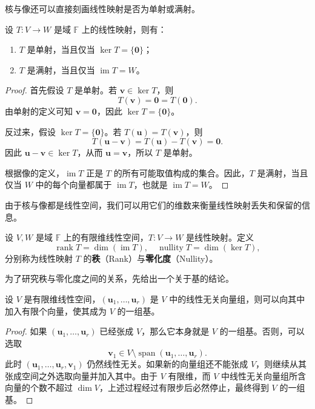 核与像还可以直接刻画线性映射是否为单射或满射。
\begin{theorem}[单射与满射的判定]
    \label{thm_injective_surjective_kernel_image}
    设 \(T:V\to W\) 是域 \(\mathbb F\) 上的线性映射，则有：
    \begin{enumerate}
        \item \(T\) 是单射，当且仅当 \(\ker T=\{\bm 0\}\)；
        \item \(T\) 是满射，当且仅当 \(\operatorname{im}T=W\)。
    \end{enumerate}
\end{theorem}
\begin{proof}
    首先假设 \(T\) 是单射。若 \(\bm v\in\ker T\)，则
    \[
        T(\bm v)=\bm 0=T(\bm 0).
    \]
    由单射的定义可知 \(\bm v=\bm 0\)，因此 \(\ker T=\{\bm 0\}\)。

    反过来，假设 \(\ker T=\{\bm 0\}\)。若 \(T(\bm u)=T(\bm v)\)，则
    \[
        T(\bm u-\bm v)=T(\bm u)-T(\bm v)=\bm 0.
    \]
    因此 \(\bm u-\bm v\in\ker T\)，从而 \(\bm u=\bm v\)，所以 \(T\) 是单射。

    根据像的定义，\(\operatorname{im}T\) 正是 \(T\) 的所有可能取值构成的集合。因此，\(T\) 是满射，当且仅当 \(W\) 中的每个向量都属于 \(\operatorname{im}T\)，也就是 \(\operatorname{im}T=W\)。
\end{proof}

由于核与像都是线性空间，我们可以用它们的维数来衡量线性映射丢失和保留的信息。
\begin{definition}[线性映射的秩与零化度]
    \label{def_linear_map_rank_nullity}
    设 \(V,W\) 是域 \(\mathbb F\) 上的有限维线性空间，\(T:V\to W\) 是线性映射。定义
    \[
        \operatorname{rank}T=\dim(\operatorname{im}T),
        \quad
        \operatorname{nullity}T=\dim(\ker T),
    \]
    分别称为线性映射 \(T\) 的\textbf{秩}（Rank）与\textbf{零化度}（Nullity）。
\end{definition}

为了研究秩与零化度之间的关系，先给出一个关于基的结论。
\begin{lemma}[基扩充]
    \label{lem_basis_extension}
    设 \(V\) 是有限维线性空间，\((\bm u_1,\ldots,\bm u_r)\) 是 \(V\) 中的线性无关向量组，则可以向其中加入有限个向量，使其成为 \(V\) 的一组基。
\end{lemma}
\begin{proof}
    如果 \((\bm u_1,\ldots,\bm u_r)\) 已经张成 \(V\)，那么它本身就是 \(V\) 的一组基。否则，可以选取
    \[
        \bm v_1\in V\setminus\operatorname{span}(\bm u_1,\ldots,\bm u_r).
    \]
    此时 \((\bm u_1,\ldots,\bm u_r,\bm v_1)\) 仍然线性无关。如果新的向量组还不能张成 \(V\)，则继续从其张成空间之外选取向量并加入其中。由于 \(V\) 有限维，而 \(V\) 中线性无关向量组所含向量的个数不超过 \(\dim V\)，上述过程经过有限步后必然停止，最终得到 \(V\) 的一组基。
\end{proof}

